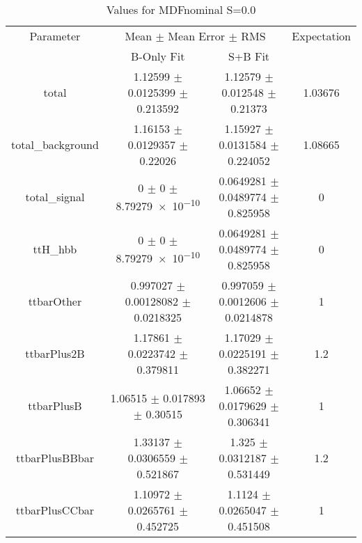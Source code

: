 \begin{table}
\centering
\caption{Values for MDFnominal S=0.0}
\begin{tabular}{cccc}
\toprule
Parameter & \multicolumn{2}{c}{Mean $\pm$ Mean Error $\pm$ RMS} & Expectation\\
 & B-Only Fit & S+B Fit & \\
\midrule
total & \num{1.12599} $\pm$ \num{0.0125399} $\pm$ \num{0.213592} & \num{1.12579} $\pm$ \num{0.012548} $\pm$ \num{0.21373} & \num{1.03676}\\
total\_background & \num{1.16153} $\pm$ \num{0.0129357} $\pm$ \num{0.22026} & \num{1.15927} $\pm$ \num{0.0131584} $\pm$ \num{0.224052} & \num{1.08665}\\
total\_signal & \num{0} $\pm$ \num{0} $\pm$ \num{8.79279e-10} & \num{0.0649281} $\pm$ \num{0.0489774} $\pm$ \num{0.825958} & \num{0}\\
ttH\_hbb & \num{0} $\pm$ \num{0} $\pm$ \num{8.79279e-10} & \num{0.0649281} $\pm$ \num{0.0489774} $\pm$ \num{0.825958} & \num{0}\\
ttbarOther & \num{0.997027} $\pm$ \num{0.00128082} $\pm$ \num{0.0218325} & \num{0.997059} $\pm$ \num{0.0012606} $\pm$ \num{0.0214878} & \num{1}\\
ttbarPlus2B & \num{1.17861} $\pm$ \num{0.0223742} $\pm$ \num{0.379811} & \num{1.17029} $\pm$ \num{0.0225191} $\pm$ \num{0.382271} & \num{1.2}\\
ttbarPlusB & \num{1.06515} $\pm$ \num{0.017893} $\pm$ \num{0.30515} & \num{1.06652} $\pm$ \num{0.0179629} $\pm$ \num{0.306341} & \num{1}\\
ttbarPlusBBbar & \num{1.33137} $\pm$ \num{0.0306559} $\pm$ \num{0.521867} & \num{1.325} $\pm$ \num{0.0312187} $\pm$ \num{0.531449} & \num{1.2}\\
ttbarPlusCCbar & \num{1.10972} $\pm$ \num{0.0265761} $\pm$ \num{0.452725} & \num{1.1124} $\pm$ \num{0.0265047} $\pm$ \num{0.451508} & \num{1}\\
\bottomrule
\end{tabular}
\end{table}
